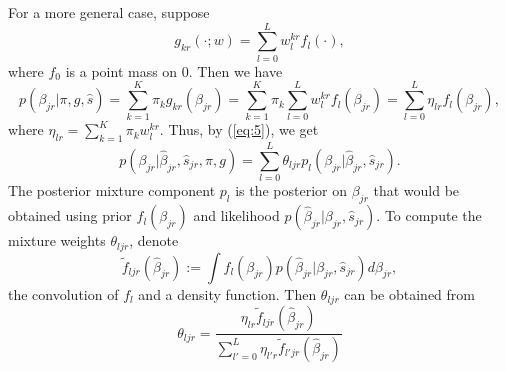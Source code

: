 \documentclass[11pt]{article}
\begin{document}
For a more general case, suppose
\begin{equation}
g_{kr}(\cdot;w) = \sum_{l=0}^L w_l^{kr}f_l(\cdot),
\label{eq:geng}
\end{equation}
where $f_0$ is a point mass on 0. Then we have 
\begin{equation}
    p(\beta_{jr}|\pi,g,\hat s) = \sum_{k=1}^K\pi_k g_{kr}(\beta_{jr})=  \sum_{k=1}^K\pi_k\sum_{l=0}^Lw_l^{kr}f_l(\beta_{jr})
    = \sum_{l=0}^L\eta_{lr}f_l(\beta_{jr}),
\end{equation}
where $\eta_{lr}=\sum_{k=1}^K\pi_kw_l^{kr}$. Thus, by (\ref{eq:5}), we get
\begin{equation}
    p(\beta_{jr}|\hat\beta_{jr},\hat s_{jr},\pi, g) = \sum_{l=0}^L\theta_{ljr}p_{l}(\beta_{jr}|\hat\beta_{jr},\hat s_{jr}).
\end{equation}
The posterior mixture component $p_l$ is the posterior on $\beta_{jr}$ that would be obtained using prior $f_l(\beta_{jr})$ and likelihood $p(\hat\beta_{jr}|\beta_{jr},\hat s_{jr})$. To compute the mixture weights $\theta_{ljr}$, denote
\begin{equation}
    \tilde f_{ljr}(\hat\beta_{jr}) := \int f_l(\beta_{jr})p(\hat\beta_{jr}|\beta_{jr},\hat s_{jr})d\beta_{jr},
\end{equation}
the convolution of $f_l$ and a density function. Then $\theta_{ljr}$ can be obtained from
\begin{equation}
    \theta_{ljr} = \frac{\eta_{lr}\tilde f_{ljr}(\hat\beta_{jr})}{\sum_{l'=0}^L\eta_{l'r}\tilde f_{l'jr}(\hat\beta_{jr})}
\end{equation}
\end{document}
